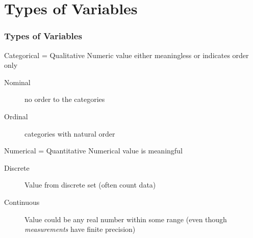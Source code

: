 \section{Types of Variables}
%
%

\begin{frame}
\frametitle{Types of Variables}
\begin{block}{Categorical = Qualitative}
Numeric value either meaningless or indicates order only 
		\begin{description}
			\item[Nominal] no order to the categories  
			\item[Ordinal]  categories with natural order 
		\end{description}
\end{block}
\pause
\begin{block}{Numerical = Quantitative}
Numerical value is meaningful
		\begin{description}
			\item[Discrete] Value from discrete set (often count data) 
      \item[Continuous] Value could be any real number within some range (even though \emph{measurements} have finite precision)
		\end{description}
\end{block}

\end{frame}

